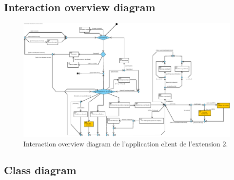 \documentclass[]{report}
\begin{document}
\subsection{Interaction overview diagram}

\begin{figure}[h]
	\centering\includegraphics[width=\linewidth]{img/Interaction Overview Client - Extension 2.pdf}
	\caption{Interaction overview diagram de l'application client de l'extension 2.}
\end{figure}


\newpage

\subsection{Class diagram}
\end{document}
